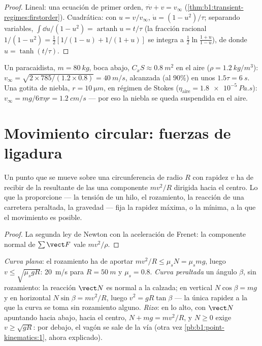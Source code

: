 \begin{proof}
Lineal: una ecuación de primer orden, $\tau\dot v + v = v_\infty$
(\cref{thm:b1:transient-regimes:firstorder}). Cuadrática: con
$u = v/v_\infty$, $\dot u = (1 - u^2)/\tau$; separando variables,
$\int\dd u/(1 - u^2) = \operatorname{artanh}u = t/\tau$ (la fracción
racional $1/(1 - u^2) = \tfrac12[1/(1 - u) + 1/(1 + u)]$ se integra a
$\tfrac12\ln\frac{1 + u}{1 - u}$), de donde $u = \tanh(t/\tau)$.
\end{proof}

\begin{example}\label{ex:b1:newton-dynamics:terminal}
Un paracaidista, $m = \qty{80}{kg}$, boca abajo, $C_xS \approx \qty{0.8}{m^2}$
en el aire ($\rho = \qty{1.2}{kg/m^3}$): $v_\infty = \sqrt{2 \times 785/(1.2
\times 0.8)} = \qty{40}{m/s}$, alcanzada (al $90\%$) en unos $1.5\tau =
\qty{6}{s}$. Una gotita de niebla, $r = \qty{10}{\micro m}$, en régimen de
Stokes ($\eta_{\text{aire}} = \qty{1.8e-5}{Pa.s}$): $v_\infty = mg/6\pi\eta r =
\qty{1.2}{cm/s}$ --- por eso la niebla se queda suspendida en el aire.
\end{example}

\section{Movimiento circular: fuerzas de ligadura}

\begin{proposition}\label{prop:b1:newton-dynamics:centripetal}
Un punto que se mueve sobre una circunferencia de radio $R$ con rapidez
$v$ ha de recibir de la resultante de las  una componente $mv^2/R$
dirigida hacia el centro. Lo que la proporcione --- la tensión de un hilo,
el rozamiento, la reacción de una carretera peraltada, la gravedad ---
fija la rapidez máxima, o la mínima, a la que el movimiento es posible.
\end{proposition}

\begin{proof}
La segunda ley de Newton con la aceleración de Frenet: la componente
normal de $\sum\vect F$ vale $mv^2/\rho$.
\end{proof}

\begin{example}\label{ex:b1:newton-dynamics:circles}
\emph{Curva plana}: el rozamiento ha de aportar $mv^2/R \leq \mu_sN = \mu_smg$,
luego $v \leq \sqrt{\mu_sgR}$: \qty{20}{m/s} para $R = \qty{50}{m}$ y
$\mu_s = 0.8$. \emph{Curva peraltada} un ángulo $\beta$, sin rozamiento:
la reacción $\vect N$ es normal a la calzada; en vertical $N\cos\beta = mg$
y en horizontal $N\sin\beta = mv^2/R$, luego $v^2 = gR\tan\beta$ --- la
única rapidez a la que la curva se toma sin rozamiento alguno.
\emph{Rizo}: en lo alto, con $\vect N$ apuntando hacia abajo, hacia el
centro, $N + mg =
mv^2/R$, y $N \geq 0$ exige $v \geq \sqrt{gR}$: por debajo, el vagón se
sale de la vía (otra vez \cref{pb:b1:point-kinematics:1}, ahora explicado).
\end{example}

